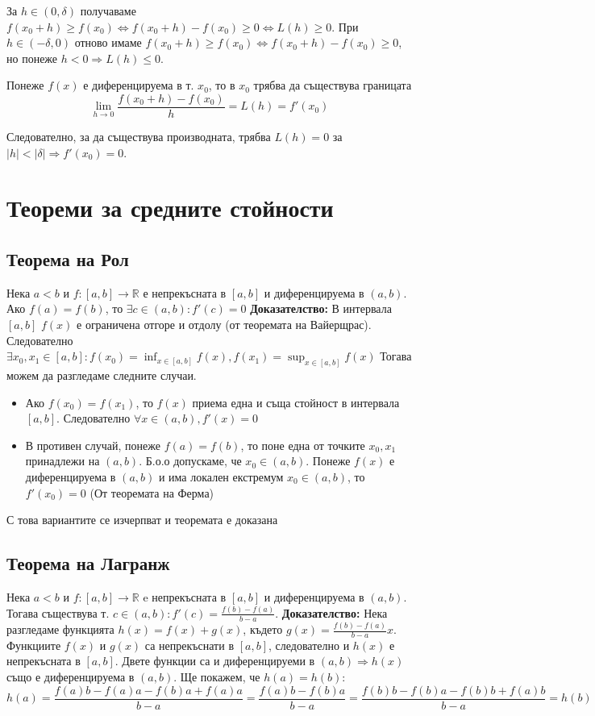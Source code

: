 \documentclass[fleqn,12pt]{article}
\begin{document}
За $h \in (0, \delta)$ получаваме $f(x_0 + h) \geq f(x_0) \Leftrightarrow f(x_0 + h) - f(x_0) \geq 0 \Leftrightarrow L(h) \geq 0$.
При $h \in (-\delta, 0)$ отново имаме $f(x_0 + h) \geq f(x_0) \Leftrightarrow f(x_0 + h) - f(x_0) \geq 0$,
но понеже $h < 0 \Rightarrow L(h) \leq 0$.

Понеже $f(x)$ е диференцируема в т. $x_0$, то в $x_0$ трябва да съществува границата
\[ \lim_{h \to 0} \frac{ f(x_0 + h)-f(x_0)}{h} = L(h) = f'(x_0) \]

Следователно, за да съществува производната, трябва $L(h) = 0$ за $|h| < |\delta| \Rightarrow f'(x_0) = 0$.

\section{Теореми  за  средните  стойности}
\subsection{Теорема на Рол}
Нека $a<b$ и $f:[a,b]\rightarrow\mathbb{R}$ е непрекъсната в $[a,b]$ и диференцируема в $(a,b)$. Ако $f(a) = f(b)$, то $\exists c \in (a,b): f'(c)=0$
\bigbreak
\textbf{Доказателство:}
В интервала $[a,b]$ $f(x)$ е ограничена отгоре и отдолу (от теоремата на Вайерщрас).
Следователно $\exists x_0,x_1 \in [a,b]: f(x_0)=\inf_{x \in [a,b]} f(x), f(x_1)=\sup_{x \in [a,b]} f(x)$
Тогава можем да разгледаме следните случаи.
\begin{itemize}
    \item Ако $f(x_0) = f(x_1)$, то $f(x)$ приема една и съща стойност в интервала $[a,b]$. Следователно $\forall x \in (a,b), f'(x)=0$ 

    \item В противен случай, понеже $f(a) = f(b)$, то поне една от точките $x_0,x_1$ принадлежи на $(a,b)$. Б.о.о допускаме, че $x_0 \in (a,b)$. Понеже $f(x)$ е диференцируема в $(a,b)$ и има локален екстремум $x_0 \in (a,b)$, то $f'(x_0) = 0$ (От теоремата на Ферма) 
\end{itemize}
С това вариантите се изчерпват и теоремата е доказана

\subsection{Теорема на Лагранж}
Нека $a<b$ и $f:[a,b]\rightarrow\mathbb{R}$ e непрекъсната в $[a,b]$ и диференцируема в $(a,b)$.
Тогава съществува т. $c \in (a,b): f'(c) = \frac{f(b)-f(a)}{b-a}$.
\bigbreak
\textbf{Доказателство:}
Нека разгледаме функцията $h(x)=f(x) + g(x)$, където $g(x) = \frac{f(b)-f(a)}{b-a}x$. Функциите $f(x)$ и $g(x)$ са непрекъснати в $[a,b]$, 
следователно и $h(x)$ е непрекъсната в $[a,b]$. Двете функции са и диференцируеми в $(a,b) \Rightarrow h(x)$ също е диференцируема в $(a,b)$.
Ще покажем, че $h(a) = h(b)$: 
\[ h(a)=\frac{f(a)b - f(a)a - f(b)a + f(a)a}{b-a} = \frac{f(a)b-f(b)a}{b-a} = \frac{f(b)b - f(b)a - f(b)b + f(a)b}{b-a} = h(b) \]
\end{document}
